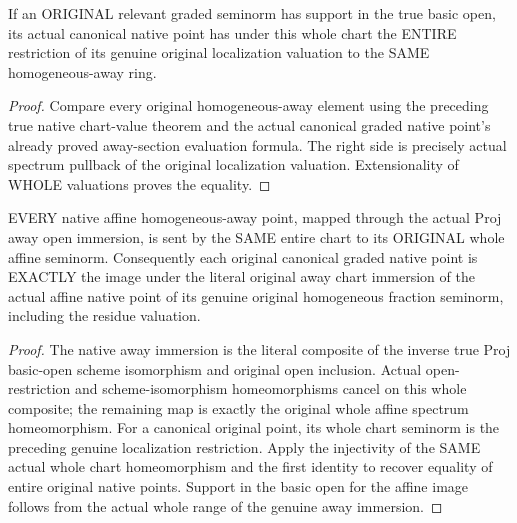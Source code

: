 \begin{theorem}
\label{projective:actual-graded-native-canonical-away-seminorm}
\leanok
{}
If an ORIGINAL relevant graded seminorm has support in the true basic
open, its actual canonical native point has under this whole chart the
ENTIRE restriction of its genuine original localization valuation to
the SAME homogeneous-away ring.
\end{theorem}
\begin{proof}
Compare every original homogeneous-away element using the preceding
true native chart-value theorem and the actual canonical graded native
point's already proved away-section evaluation formula. The right side
is precisely actual spectrum pullback of the original localization
valuation. Extensionality of WHOLE valuations proves the equality.
\end{proof}

\begin{theorem}
\label{projective:actual-graded-native-away-point-recovery}
\leanok
{}
EVERY native affine homogeneous-away point, mapped through the actual
Proj away open immersion, is sent by the SAME entire chart to its
ORIGINAL whole affine seminorm. Consequently each original canonical
graded native point is EXACTLY the image under the literal original away
chart immersion of the actual affine native point of its genuine
original homogeneous fraction seminorm, including the residue valuation.
\end{theorem}
\begin{proof}
The native away immersion is the literal composite of the inverse true
Proj basic-open scheme isomorphism and original open inclusion. Actual
open-restriction and scheme-isomorphism homeomorphisms cancel on this
whole composite; the remaining map is exactly the original whole affine
spectrum homeomorphism. For a canonical original point, its whole chart
seminorm is the preceding genuine localization restriction. Apply the
injectivity of the SAME actual whole chart homeomorphism and the first
identity to recover equality of entire original native points. Support
in the basic open for the affine image follows from the actual whole
range of the genuine away immersion.
\end{proof}
